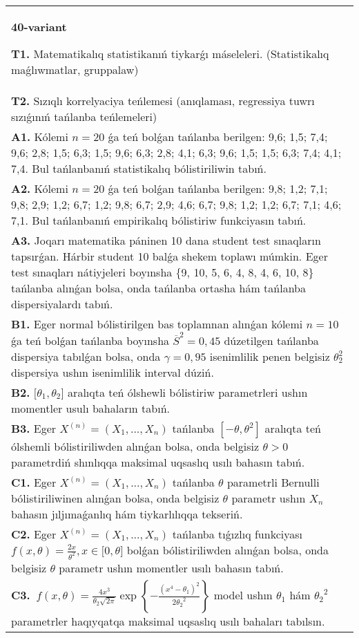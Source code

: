 \documentclass{article}
\begin{document}
\begin{tabular}{m{17cm}}
\textbf{40-variant}
\newline

\textbf{T1.} Matematikalıq statistikanıń tiykarǵı máseleleri. (Statistikalıq maǵlıwmatlar, gruppalaw)
 \\
\textbf{T2.} 
Sızıqlı korrelyaciya teńlemesi (anıqlaması, regressiya tuwrı sızıǵınıń tańlanba teńlemeleri)
 \\
\textbf{A1.} 
Kólemi \(n = 20\) ǵa teń bolǵan tańlanba berilgen: 9,6; 1,5; 7,4; 9,6; 2,8; 1,5; 6,3; 1,5; 9,6; 6,3; 2,8; 4,1; 6,3; 9,6; 1,5; 1,5; 6,3; 7,4; 4,1; 7,4. Bul tańlanbanıń statistikalıq bólistiriliwin tabıń.
 \\
\textbf{A2.} 
Kólemi \(n = 20\) ǵa teń bolǵan tańlanba berilgen: 9,8; 1,2; 7,1; 9,8; 2,9; 1,2; 6,7; 1,2; 9,8; 6,7; 2,9; 4,6; 6,7; 9,8; 1,2; 1,2; 6,7; 7,1; 4,6; 7,1. Bul tańlanbanıń empirikalıq bólistiriw funkciyasın tabıń.
 \\
\textbf{A3.} 
Joqarı matematika páninen 10 dana student test sınaqların tapsırǵan. Hárbir student 10 balǵa shekem toplawı múmkin. Eger test sınaqları nátiyjeleri boyınsha \{9, 10, 5, 6, 4, 8, 4, 6, 10, 8\} tańlanba alınǵan bolsa, onda tańlanba ortasha hám tańlanba dispersiyalardı tabıń.
 \\
\textbf{B1.} 
Eger normal bólistirilgen bas toplamnan alınǵan kólemi \(n = 10\) ǵa teń bolǵan tańlanba boyınsha \({\overline{S}}^{2} = 0,45\) dúzetilgen tańlanba dispersiya tabılǵan bolsa, onda \(\gamma = 0,95\) isenimlilik penen belgisiz \(\theta_{2}^{2}\) dispersiya ushın isenimlilik interval dúziń.
 \\
\textbf{B2.} 
\(\lbrack\theta_{1},\theta_{2}\rbrack\) aralıqta teń ólshewli bólistiriw parametrleri ushın momentler usulı bahaların tabıń.
 \\
\textbf{B3.} 
Eger \(X^{(n)} = \left( X_{1},...,X_{n} \right)\) tańlanba \(\left\lbrack - \theta,\theta^{2} \right\rbrack\) aralıqta teń ólshemli bólistiriliwden alınǵan bolsa, onda belgisiz \(\theta > 0\) parametrdiń shınlıqqa maksimal uqsaslıq usılı bahasın tabıń.
 \\
\textbf{C1.} 
Eger \(X^{(n)} = \left( X_{1},...,X_{n} \right)\) tańlanba \(\theta\) parametrli Bernulli bólistiriliwinen alınǵan bolsa, onda belgisiz \(\theta\) parametr ushın \(X_{n}\) bahasın jıljımaǵanlıq hám tiykarlılıqqa tekseriń.
 \\
\textbf{C2.} 
Eger \(X^{(n)} = \left( X_{1},...,X_{n} \right)\) tańlanba tıǵızlıq funkciyası
$f(x,\theta) = \frac{2x}{\theta^{2}},x \in \lbrack 0,\theta\rbrack$
bolǵan bólistiriliwden alınǵan bolsa, onda belgisiz \(\theta\) parametr ushın momentler usılı bahasın tabıń.
 \\
\textbf{C3.} 
\(\ f(x,\theta) = \frac{4x^{3}}{\theta_{2}\sqrt{2\pi}}\exp\left\{ - \frac{\left( x^{4} - \theta_{1} \right)^{2}}{2{\theta_{2}}^{2}} \right\}\) model ushın \(\theta_{1}\) hám \({\theta_{2}}^{2}\) parametrler haqıyqatqa maksimal uqsaslıq usılı bahaları tabılsın.
 \\

\end{tabular}
\vspace{1cm}
\end{document}

